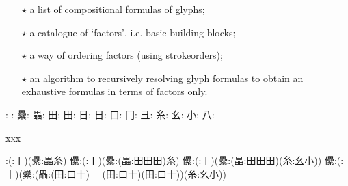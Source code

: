 
\FPmul{}%
\FPmul{}\begin{multicols}{2}\begin{itemize}\item[$\star$] a list of compositional formulas of glyphs;\mktsShowpar\par

\item[$\star$] a catalogue of ‘factors’, i.e. basic building blocks;\mktsShowpar\par

\item[$\star$] a way of ordering factors (using strokeorders);\mktsShowpar\par

\item[$\star$] an algorithm to recursively resolving glyph formulas
to obtain an exhaustive formulas in terms of factors
only.\mktsShowpar\par

\end{itemize}\begingroup\mktsObeyAllLines{}

\begingroup{}: 
{\cjk{}}: 
{\cjk{}纍}: 
{\cjk{}畾}: 
{\cjk{}田}: 
{\cjk{}田}: 
{\cjk{}日}: 
{\cjk{}日}: 
{\cjk{}口}: 
{\cjk{}冂}: 
{\cjk{}彐}: 
{\cjk{}糸}: 
{\cjk{}幺}: 
{\cjk{}小}: 
{\cjk{}八}: 
\endgroup{}{}

\endgroup{}xxx\mktsShowpar\par
\begingroup\mktsObeyAllLines{}

\begingroup{}:({\cjk{}}:{\cjk{}丨})({\cjk{}纍}:{\cjk{}畾糸}) 
{\cjk{}儽}:({\cjk{}}:{\cjk{}丨})({\cjk{}纍}:({\cjk{}畾}:{\cjk{}田田田}){\cjk{}糸}) 
{\cjk{}儽}:({\cjk{}}:{\cjk{}丨})({\cjk{}纍}:({\cjk{}畾}:{\cjk{}田田田})({\cjk{}糸}:{\cjk{}幺小})) 
{\cjk{}儽}:({\cjk{}}:{\cjk{}丨})({\cjk{}纍}:({\cjk{}畾}:({\cjk{}田}:{\cjk{}口十}) 
  ({\cjk{}田}:{\cjk{}口十})({\cjk{}田}:{\cjk{}口十}))({\cjk{}糸}:{\cjk{}幺小})) 
\endgroup{}{}


\end{multicols}
